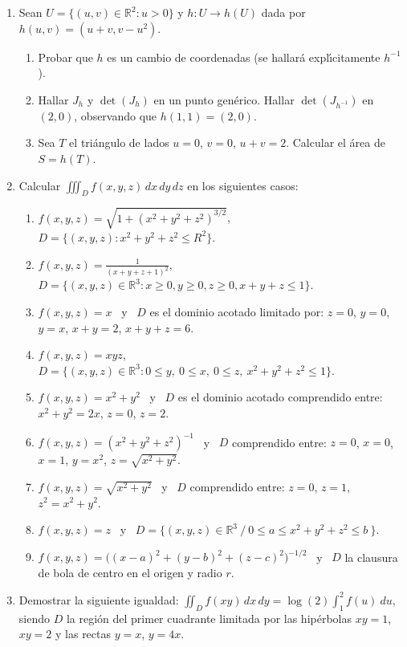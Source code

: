 \documentclass[11pt]{article}
\newcommand{\be}{\begin{enumerate}}
\newcommand{\ee}{\end{enumerate}}
\newcommand{\R}{\mathbb{R}}
\begin{document}
\begin{enumerate}
 \item Sean $U=\{(u,v)\in \R^{2}\colon u>0\}$ y $h\colon U\rightarrow
      h(U)$ dada por $h(u,v)=(u+v,v-u^{2})$. 
      \be
       \item Probar que $h$ es un cambio de coordenadas (se
             hallar\'{a} expl\'{\i}citamente $h^{-1}$). 
       \item Hallar $J_{h}$ y $\det(J_{h})$ en un punto gen\'erico.  
             Hallar $\det(J_{h^{-1}})$ en $(2,0)$, observando que
             $h(1,1)=(2,0)$. 
       \item Sea $T$ el tri\'{a}ngulo de lados $u=0$, $v=0$, $u+v=2$.  
             Calcular el \'area de $S=h(T)$.
      \ee
\item Calcular $ \iiint_{D}f(x,y,z) \,dx\,dy\,dz$ en los siguientes casos:
\be
  \item $f(x,y,z)=\sqrt{1+(x^2+y^2+z^2)^{3/2}}$, $D=\{(x,y,z)\colon
        x^2+y^2+z^2\leq  R^2\}$.  
  \item $f(x,y,z)=\frac{1}{(x+y+z+1)^{2}},$ $D=\{(x,y,z)\in
        \R^{3}\colon x\geq 0, y\geq 0, z\geq 0, x+y+z \leq 1  \}$. 
  \item $f(x,y,z)=x$ \ y \ $D$ es el dominio acotado limitado por: 
        $z=0$, $y=0$, $y=x$, $x+y=2$, $x+y+z=6$.
  \item\label{bonus11b} $f(x,y,z)=xyz$, \  $D=\{ (x,y,z)\in
        \R^{3}\colon 0 \leq y , \ 
        0 \leq x, \ 0 \leq z , \      x^{2}+y^{2}+z^{2} \leq 1 \}$. 
  \item $f(x,y,z)=x^{2}+y^{2}$ \ y \ $D$ es el dominio acotado
        comprendido entre:      $x^{2}+y^{2}=2x$, $z=0$, $z=2$. 
  \item $f(x,y,z)=(x^{2}+y^{2}+z^{2})^{-1}$ \ y \ $D$ comprendido
        entre: $z=0$, $x=0$, $x=1$, $y=x^{2}$,
        $z=\sqrt{x^{2}+y^{2}}$. 
  \item $f(x,y,z)=\sqrt{x^{2}+y^{2}}$ \ y \ $D$ comprendido entre:
        $z=0$, $z=1$, $z^{2}=x^{2}+y^{2}$. 
  \item $f(x,y,z)=z$ \ y \ $D=\{ (x,y,z)\in \R^{3}\ /\ 
        0 \leq  a \leq x^{2}+y^{2}+z^{2} \leq b \ \}$. 
  \item $f(x,y,z)=\big((x-a)^{2}+(y-b)^{2}+(z-c)^{2}\big)^{-1/2}$  
        \ y \ $D$ la clausura de bola de centro en el origen y radio
        $r$. 
\ee

\item Demostrar la siguiente igualdad: 
      $
      \iint_{D} f(xy) \,dx\,dy=\log(2)\int_{1}^{2}f(u)\ du,  
      $ siendo $D$ la regi\'{o}n del primer cuadrante limitada por
      las hip\'erbolas $xy=1$, $xy=2$ y las rectas $y=x$, $y=4x$. 

\end{enumerate}
\end{document}
